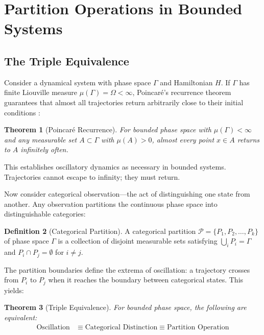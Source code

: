 \documentclass[twocolumn,10pt,a4paper]{article}
\newtheorem{theorem}{Theorem}[section]
\theoremstyle{definition}
\newtheorem{definition}[theorem]{Definition}
\theoremstyle{remark}
\newcommand{\Partition}{\mathcal{P}}
\begin{document}
\section{Partition Operations in Bounded Systems}
\label{sec:partition}

\subsection{The Triple Equivalence}

Consider a dynamical system with phase space $\Gamma$ and Hamiltonian $H$. If $\Gamma$ has finite Liouville measure $\mu(\Gamma) = \Omega < \infty$, Poincar\'{e}'s recurrence theorem guarantees that almost all trajectories return arbitrarily close to their initial conditions \cite{poincare1890}:

\begin{theorem}[Poincar\'{e} Recurrence]
\label{thm:poincare}
For bounded phase space with $\mu(\Gamma) < \infty$ and any measurable set $A \subset \Gamma$ with $\mu(A) > 0$, almost every point $x \in A$ returns to $A$ infinitely often.
\end{theorem}

This establishes oscillatory dynamics as necessary in bounded systems. Trajectories cannot escape to infinity; they must return.

Now consider categorical observation---the act of distinguishing one state from another. Any observation partitions the continuous phase space into distinguishable categories:

\begin{definition}[Categorical Partition]
\label{def:partition}
A categorical partition $\Partition = \{P_1, P_2, \ldots, P_k\}$ of phase space $\Gamma$ is a collection of disjoint measurable sets satisfying $\bigcup_i P_i = \Gamma$ and $P_i \cap P_j = \emptyset$ for $i \neq j$.
\end{definition}

The partition boundaries define the extrema of oscillation: a trajectory crosses from $P_i$ to $P_j$ when it reaches the boundary between categorical states. This yields:

\begin{theorem}[Triple Equivalence]
\label{thm:triple}
For bounded phase space, the following are equivalent:
\begin{align}
\text{Oscillation} &\equiv \text{Categorical Distinction} \equiv \text{Partition Operation}
\end{align}
\end{theorem}
\end{document}
